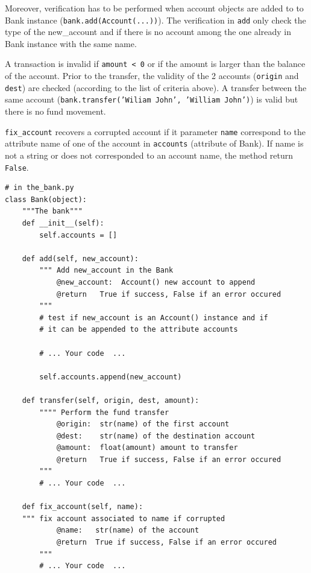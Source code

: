 \documentclass{42-en}
\begin{document}
Moreover, verification has to be performed when account objects are added to to Bank instance 
(\texttt{bank.add(Account(...))}).
The verification in \texttt{add} only check the type of the new\_account and if there 
is no account among the one already in Bank instance with the same name.

A transaction is invalid if \texttt{amount < 0} or if the amount is larger than
the balance of the account.
Prior to the transfer, the validity of the 2 accounts (\texttt{origin} and \texttt{dest}) are checked
(according to the list of criteria above).
A transfer between the same account (\texttt{bank.transfer('Wiliam John', 'William John')})
is valid but there is no fund movement.

\texttt{fix\_account} recovers a corrupted account if it parameter \texttt{name} correspond to the attribute
name of one of the account in \texttt{accounts} (attribute of Bank). If name is not a string or does not corresponded
to an account name, the method return \texttt{False}.

\begin{verbatim}
# in the_bank.py
class Bank(object):
    """The bank"""
    def __init__(self):
        self.accounts = []

    def add(self, new_account):
        """ Add new_account in the Bank
            @new_account:  Account() new account to append
            @return   True if success, False if an error occured
        """
        # test if new_account is an Account() instance and if 
        # it can be appended to the attribute accounts
        
        # ... Your code  ...

        self.accounts.append(new_account)

    def transfer(self, origin, dest, amount):
        """" Perform the fund transfer
            @origin:  str(name) of the first account
            @dest:    str(name) of the destination account
            @amount:  float(amount) amount to transfer
            @return   True if success, False if an error occured
        """
        # ... Your code  ...

    def fix_account(self, name):
    """ fix account associated to name if corrupted
            @name:   str(name) of the account
            @return  True if success, False if an error occured
        """
        # ... Your code  ...
\end{verbatim}
\end{document}
